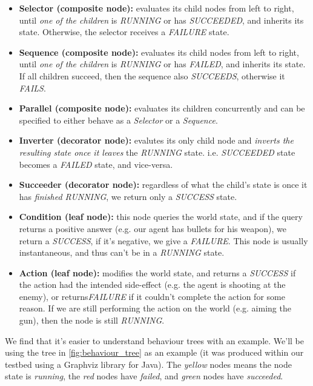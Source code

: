 \documentclass[a4paper, twocolumn]{article}
\begin{document}
        \begin{itemize}
            \item{\textbf{Selector (composite node):} evaluates its child nodes from left to right, until \emph{one of the children} is \emph{RUNNING} or has \emph{SUCCEEDED}, and inherits its state. Otherwise, the selector receives a \emph{FAILURE} state.}
            \item{\textbf{Sequence (composite node):} evaluates its child nodes from left to right, until \emph{one of the children} is \emph{RUNNING} or has \emph{FAILED}, and inherits its state. If all children succeed, then the sequence also \emph{SUCCEEDS}, otherwise it \emph{FAILS}.}
            \item{\textbf{Parallel (composite node):} evaluates its children concurrently and can be specified to either behave as a \emph{Selector} or a \emph{Sequence}. }
            \item{\textbf{Inverter (decorator node):} evalutes its only child node and \emph{inverts the resulting state once it leaves} the \emph{RUNNING} state. i.e. \emph{SUCCEEDED} state becomes a \emph{FAILED} state, and vice-versa.}
            \item{\textbf{Succeeder (decorator node):} regardless of what the child's state is once it has \emph{finished RUNNING}, we return only a \emph{SUCCESS} state.}
            \item{\textbf{Condition (leaf node):} this node queries the world state, and if the query returns a positive answer (e.g. our agent has bullets for his weapon), we return a \emph{SUCCESS}, if it's negative, we give a \emph{FAILURE}. This node is usually instantaneous, and thus can't be in a \emph{RUNNING} state.}
            \item{\textbf{Action (leaf node):} modifies the world state, and returns a \emph{SUCCESS} if the action had the intended side-effect (e.g. the agent is shooting at the enemy), or returns\emph{FAILURE} if it couldn't complete the action for some reason. If we are still performing the action on the world (e.g. aiming the gun), then the node is still \emph{RUNNING}.}

        \end{itemize}

        We find that it's easier to understand behaviour trees with an example. We'll be using the tree in \cref{fig:behaviour_tree} as an example (it was produced within our testbed using a Graphviz library for Java). The \emph{yellow} nodes means the node state is \emph{running}, the \emph{red} nodes have \emph{failed}, and \emph{green} nodes have \emph{succeeded}.
\end{document}
